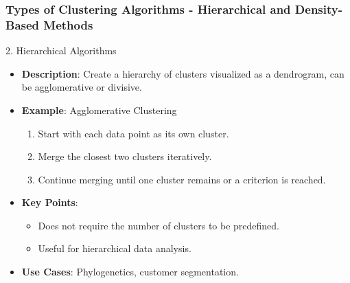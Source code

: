 \documentclass[aspectratio=169]{beamer}
\begin{document}
\begin{frame}[fragile]
    \frametitle{Types of Clustering Algorithms - Hierarchical and Density-Based Methods}
    \begin{block}{2. Hierarchical Algorithms}
        \begin{itemize}
            \item \textbf{Description}: Create a hierarchy of clusters visualized as a dendrogram, can be agglomerative or divisive.
            \item \textbf{Example}: Agglomerative Clustering
            \begin{enumerate}
                \item Start with each data point as its own cluster.
                \item Merge the closest two clusters iteratively.
                \item Continue merging until one cluster remains or a criterion is reached.
            \end{enumerate}
            \item \textbf{Key Points}:
            \begin{itemize}
                \item Does not require the number of clusters to be predefined.
                \item Useful for hierarchical data analysis.
            \end{itemize}
            \item \textbf{Use Cases}: Phylogenetics, customer segmentation.
        \end{itemize}
    \end{block}


\end{frame}
\end{document}
